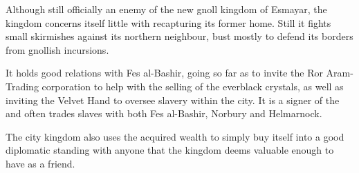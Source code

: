Although still officially an enemy of the new gnoll kingdom of Esmayar, the
kingdom concerns itself little with recapturing its former home. Still it
fights small skirmishes against its northern neighbour, bust mostly to
defend its borders from gnollish incursions.

It holds good relations with Fes al-Bashir, going so far as to invite the Ror
Aram-Trading corporation to help with the selling of the everblack crystals,
as well as inviting the Velvet Hand to oversee slavery within the city. It is
a signer of the  and often trades slaves with both
Fes al-Bashir, Norbury and Helmarnock.

The city kingdom also uses the acquired wealth to simply buy itself into
a good diplomatic standing with anyone that the kingdom deems valuable enough
to have as a friend.

